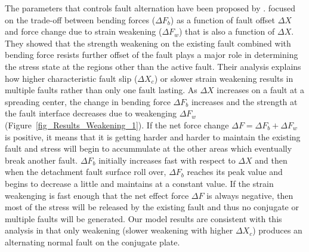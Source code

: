 The parameters that controls fault alternation have been proposed by \citet{Lavier2000}. \citet{Lavier2000} focused on the trade-off between bending forces ($\Delta F_{b}$) as a function of fault offset $\Delta X$ and force change due to strain weakening ($\Delta F_{w}$) that is also a function of  $\Delta X$. They showed that the strength weakening on the existing fault combined with bending force resists further offset of the fault plays a major role in determining the stress state at the regions other than the active fault. Their analysis explains how higher characteristic fault slip ($\Delta X_{c}$) or slower strain weakening results in multiple faults rather than only one fault lasting. %
 As $\Delta X$ increases on a fault at a spreading center, the change in bending force $\Delta F_{b}$ increases and the strength at the fault interface decreases due to weakenging $\Delta F_{w}$ (Figure~\hyperref[fig_Results_Weakening_1]{\ref{fig_Results_Weakening_1}}). If the net force change $\Delta F = \Delta F_{b}+ \Delta F_{w}$ is positive, it means that it is getting harder and harder to maintain the existing fault and stress will begin to accummulate at the other areas which eventually break another fault. $\Delta F_{b}$ initially increases fast with respect to $\Delta X$ and then when the detachment fault surface roll over, $\Delta F_{b}$ reaches its peak value and begins to decrease a little and maintains at a constant value. If the strain weakenging is fast enough that the net effect force $\Delta F$ is always negative, then most of the stress will be released by the existing fault and thus no conjugate or multiple faults will be generated. 
Our model results are consistent with this analysis in that only weakening (slower weakening with higher $\Delta X_{c}$) produces an alternating normal fault on the conjugate plate.


